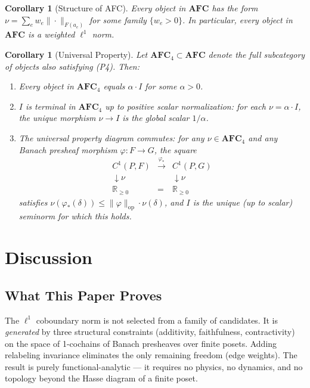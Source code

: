 \documentclass[11pt,a4paper]{amsart}
\theoremstyle{plain}
\newtheorem{corollary}[theorem]{Corollary}
\theoremstyle{definition}
\DeclareMathOperator{\opnorm}{op}
\begin{document}
\begin{corollary}[Structure of AFC]\label{cor:afc}
Every object in $\mathbf{AFC}$ has the form $\nu = \sum_e w_e \|\cdot\|_{F(a_e)}$ for some family $\{w_e > 0\}$. In particular, every object in $\mathbf{AFC}$ is a weighted $\ell^1$ norm.
\end{corollary}

\begin{corollary}[Universal Property]\label{cor:universal}
Let $\mathbf{AFC}_4 \subset \mathbf{AFC}$ denote the full subcategory of objects also satisfying \textup{(P4)}. Then:
\begin{enumerate}[label=(\roman*),nosep]
  \item Every object in $\mathbf{AFC}_4$ equals $\alpha \cdot I$ for some $\alpha > 0$.
  \item $I$ is terminal in $\mathbf{AFC}_4$ up to positive scalar normalization: for each $\nu = \alpha \cdot I$, the unique morphism $\nu \to I$ is the global scalar $1/\alpha$.
  \item The universal property diagram commutes: for any $\nu \in \mathbf{AFC}_4$ and any Banach presheaf morphism $\varphi: F \to G$, the square
  \[
  \begin{array}{ccc}
    C^1(P, F) & \xrightarrow{\varphi_*} & C^1(P, G) \\
    \downarrow{\nu} & & \downarrow{\nu} \\
    \mathbb{R}_{\geq 0} & = & \mathbb{R}_{\geq 0}
  \end{array}
  \]
  satisfies $\nu(\varphi_*(\delta)) \leq \|\varphi\|_{\opnorm} \cdot \nu(\delta)$, and $I$ is the unique (up to scalar) seminorm for which this holds.
\end{enumerate}
\end{corollary}

\section{Discussion}

\subsection{What This Paper Proves}

The $\ell^1$ coboundary norm is not selected from a family of candidates. It is \emph{generated} by three structural constraints (additivity, faithfulness, contractivity) on the space of 1-cochains of Banach presheaves over finite posets. Adding relabeling invariance eliminates the only remaining freedom (edge weights). The result is purely functional-analytic --- it requires no physics, no dynamics, and no topology beyond the Hasse diagram of a finite poset.
\end{document}
